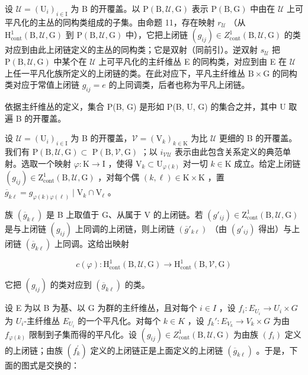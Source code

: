 设 \(\mathcal{U} = (\mathrm{U}_i)_{i\in \mathrm{I}}\) 为 B 的开覆盖。以 \(\mathrm{P(B,\mathcal{U},G)}\) 表示 \(\mathrm{P(B,G)}\) 中由在 \(\mathcal{U}\) 上可平凡化的主丛的同构类组成的子集。由命题 11，存在映射 \(r_{\mathcal{U}}\) （从 \(\mathrm{H}_{\mathrm{cont}}^{1}(\mathrm{B},\mathcal{U},\mathrm{G})\) 到 \(\mathrm{P(B,\mathcal{U},G)}\) 中），它把上闭链 \((g_{ij})\in Z_{\mathrm{cont}}^{1}(\mathrm{B},\mathcal{U},\mathrm{G})\) 的类对应到由此上闭链定义的主丛的同构类；它是双射（同前引）。逆双射 \(s_{\mathcal{U}}\) 把 \(\mathrm{P(B,\mathcal{U},G)}\) 中某个在 \(\mathcal{U}\) 上可平凡化的主纤维丛 E 的同构类，对应到由 E 在 \(\mathcal{U}\) 上任一平凡化族所定义的上闭链的类。在此对应下，平凡主纤维丛 \(\mathrm{B}\times \mathrm{G}\) 的同构类对应于常值上闭链 \(g_{ij} = e\) 的上同调类，后者也称为平凡上闭链。

依据主纤维丛的定义，集合 P(B, G) 是形如 P(B, U, G) 的集合之并，其中 U 取遍 B 的开覆盖。

设 \(\mathcal{U} = (\mathrm{U}_i)_{i\in \mathrm{I}}\) 为 B 的开覆盖，\(\mathcal{V} = (\mathrm{V}_k)_{k\in \mathrm{K}}\) 为比 \(\mathcal{U}\) 更细的 B 的开覆盖。我们有 \(\mathrm{P(B,\mathcal{U},G)}\subset\) \(\mathrm{P(B,\mathcal{V},G)}\) ；以 \(i_{\mathcal{V}\mathcal{U}}\) 表示由此包含关系定义的典范单射。选取一个映射 \(\varphi \colon \mathrm{K}\to \mathrm{I}\) ，使得 \(\mathrm{V}_k\subset \mathrm{U}_{\varphi (k)}\) 对一切 \(k\in \mathrm{K}\) 成立。给定上闭链 \((g_{ij})\in \mathrm{Z}_{\mathrm{cont}}^1 (\mathrm{B},\mathcal{U},\mathrm{G})\) ，对每个偶 \((k,\ell)\in \mathrm{K}\times \mathrm{K}\) ，置 \(\overline{g}_{k\ell} = g_{\varphi (k)\varphi (\ell)}\mid \mathrm{V}_k\cap \mathrm{V}_\ell\) 。

族 \((\overline{g}_{k\ell})\) 是 B 上取值于 G、从属于 V 的上闭链。若 \((g'_{ij}) \in \mathrm{Z}_{\mathrm{cont}}^{1}(\mathrm{B}, \mathcal{U}, \mathrm{G})\) 是与上闭链 \((g_{ij})\) 上同调的上闭链，则上闭链 \((\overline{g}'_{k\ell})\) （由 \((g'_{ij})\) 得出）与上闭链 \((\overline{g}_{k\ell})\) 上同调。这给出映射

\[
c (\varphi) \colon \mathrm{H} _ {\mathrm{cont}} ^ {1} (\mathrm{B}, \mathcal {U}, \mathrm{G}) \to \mathrm{H} _ {\mathrm{cont}} ^ {1} (\mathrm{B}, \mathcal {V}, \mathrm{G})
\]

它把 \((g_{ij})\) 的类对应到 \((\overline{g}_{k\ell})\) 的类。

设 E 为以 B 为基、以 G 为群的主纤维丛，且对每个 \(i \in I\) ，设 \(f_i: E_{U_i} \to U_i \times G\) 为 \(U_i\)-主纤维丛 \(E_{U_i}\) 的一个平凡化。对每个 \(k \in K\) ，设 \(f_k' : E_{V_k} \to V_k \times G\) 为由 \(f_{\varphi(k)}\) 限制到子集而得的平凡化。设 \((g_{ij}) \in Z_{\mathrm{cont}}^1(\mathrm{B}, \mathcal{U}, \mathrm{G})\) 为由族 \((f_i)\) 定义的上闭链；由族 \((f_{k}^{\prime})\) 定义的上闭链正是上面定义的上闭链 \((\overline{g}_{k\ell})\) 。于是，下面的图式是交换的：

